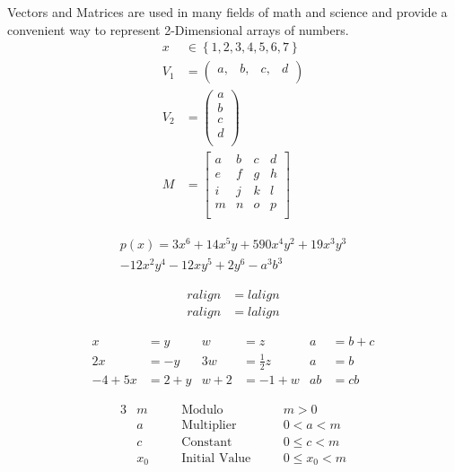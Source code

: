 		Vectors and Matrices are used in many fields of math and science and provide a convenient way to represent 2-Dimensional arrays of numbers.
		\begin{align}
			x&\in{}\left\{1,2,3,4,5,6,7\right\}\\
			V_{1} &= {\left(
			\begin{array}{cccc}
				a, & b, & c, & d\\
			\end{array}
			\right)}\\
			V_{2} &= \left(
			\begin{array}{c}
				a \\
				b \\
				c \\
				d \\
			\end{array}
			\right)\\
			M &= {\left[
			\begin{array}{cccc}
				a & b & c & d\\
				e & f & g & h\\
				i & j & k & l\\
				m & n & o & p\\
			\end{array}
			\right]}
		\end{align}
		
		\begin{multline*}
			p(x) = 3x^6 + 14x^5y + 590x^4y^2 + 19x^3y^3\\ 
			- 12x^2y^4 - 12xy^5 + 2y^6 - a^3b^3
		\end{multline*}
		
		\begin{align}
			ralign &= lalign \\
			ralign &= lalign
		\end{align}
		
		\begin{align*}
			 x      &=  y   &  w   &= z              &  a  &= b+c \\
			 2x     &= -y   &  3w  &= \frac{1}{2}z   &  a  &= b   \\
			-4 + 5x &= 2+y  &  w+2 &= -1+w           &  ab &= cb
		\end{align*}
		
		\begin{alignat*}{3}
			& m   \quad && \text{Modulo}        \quad && m>0\\
			& a   \quad && \text{Multiplier}    \quad && 0<a<m\\
			& c   \quad && \text{Constant}      \quad && 0\leq c<m\\
			& x_0 \quad && \text{Initial Value} \quad && 0\leq x_0 <m
		\end{alignat*}
		
